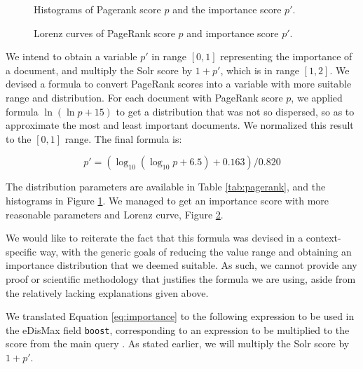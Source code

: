 \documentclass[sigconf, authorversion]{acmart}
\begin{document}
\begin{figure}[t]
    \centering
    \begin{minipage}[t]{0.5\linewidth}
        \centering
        
    \end{minipage}%
    \begin{minipage}[t]{0.5\linewidth}
        \centering
        
    \end{minipage}
    
    \caption{Histograms of Pagerank score $p$ and the importance score $p'$.} \label{fig:pagerank}
\end{figure}

\begin{figure}[t]
    \centering
    
    \caption{Lorenz curves of PageRank score $p$ and importance score $p'$.} \label{fig:pagerank-lorenz}
\end{figure}

We intend to obtain a variable $p'$ in range $[0, 1]$ representing the importance of a document, and multiply the Solr score by $1 + p'$, which is in range $[1, 2]$.
We devised a formula to convert PageRank scores into a variable with more suitable range and distribution.
For each document with PageRank score $p$, we applied formula $\ln{(\ln{p}+15)}$ to get a distribution that was not so dispersed, so as to approximate the most and least important documents. We normalized this result to the $[0, 1]$ range. The final formula is:

\noindent
\begin{equation}
    p' = (\log_{10}{(\log_{10}{p} + 6.5)} + 0.163)/0.820 \label{eq:importance}
\end{equation}

The distribution parameters are available in Table \ref{tab:pagerank}, and the histograms in Figure \ref{fig:pagerank}. We managed to get an importance score with more reasonable parameters and Lorenz curve, Figure \ref{fig:pagerank-lorenz}.

We would like to reiterate the fact that this formula was devised in a context-specific way, with the generic goals of reducing the value range and obtaining an importance distribution that we deemed suitable. As such, we cannot provide any proof or scientific methodology that justifies the formula we are using, aside from the relatively lacking explanations given above.

We translated Equation \ref{eq:importance} to the following expression to be used in the eDisMax field \texttt{boost}, corresponding to an expression to be multiplied to the score from the main query \cite{edismax}. As stated earlier, we will multiply the Solr score by $1+p'$.
\end{document}
